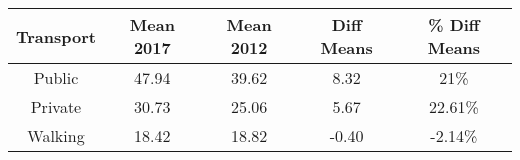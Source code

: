 \begin{table}[ht]
\centering
\begin{tabular}{ccccc}
  \hline
Transport & Mean 2017 & Mean 2012 & Diff Means & \% Diff Means \\ 
  \hline
Public & 47.94 & 39.62 & 8.32 & 21\% \\ 
  Private & 30.73 & 25.06 & 5.67 & 22.61\% \\ 
  Walking & 18.42 & 18.82 & -0.40 & -2.14\% \\ 
   \hline
\end{tabular}
\end{table}
